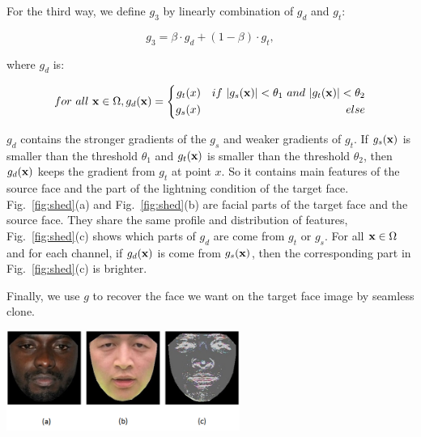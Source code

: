 For the third way, we define $g_3$ by linearly combination of $g_d$ and $g_t$:

\begin{equation}
\label{eq:gradient-shed}
g_3 = \beta \cdot g_d+(1-\beta) \cdot g_t,
\end{equation}


where $g_d$ is:

\begin{equation}
\label{eq:gradient-mixed-sub}
for\ all\ \vb{x} \in \Omega, g_d(\vb{x})=\left\{
\begin{aligned}
g_t(x) &&{if \ |g_s(\vb{x})|< \theta_1 \ and \ |g_t(\vb{x})|< \theta_2}\\
g_s(x) &&{else}\\
\end{aligned}
\right.
\end{equation}


$g_d$ contains the stronger gradients of the $g_s$ and weaker gradients of $g_t$. If $g_s(\mathbf{x})$ is smaller than the threshold $\theta_1$ and $g_t(\mathbf{x})$ is smaller than the threshold $\theta_2$, then $g_d(\mathbf{x})$ keeps the gradient from $g_t$ at point $x$. So it contains main features of the source face and the part of the lightning condition of the target face. Fig.~\ref{fig:shed}(a) and Fig.~\ref{fig:shed}(b) are facial parts of the target face and the source face. They share the same profile and distribution of features, Fig.~\ref{fig:shed}(c) shows which parts of $g_d$ are come from $g_t$ or $g_s$. For all $\mathbf{x} \in \Omega$ and for each channel, if $g_d(\mathbf{x})$ is come from $g_s(\mathbf{x})$, then the corresponding part in Fig.~\ref{fig:shed}(c) is brighter.


Finally, we use $g$ to recover the face we want on the target face image by seamless clone.
\begin{center}
    \includegraphics[width=3in]{images/labelmasks.png}
    \label{fig:shed}
\end{center}
